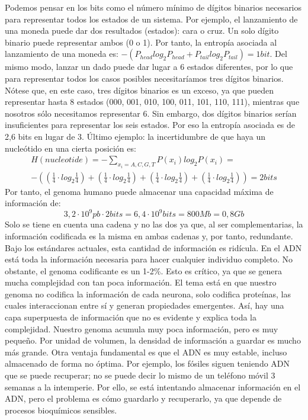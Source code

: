 Podemos pensar en los bits como el número mínimo de dígitos binarios necesarios para representar todos los estados de un sistema. Por ejemplo, el lanzamiento de una moneda puede dar dos resultados (estados): cara o cruz. Un solo dígito binario puede representar ambos (0 o 1). Por tanto, la entropía asociada al lanzamiento de una moneda es: $-(P_{head} log_2 P_{head} + P_{tail} log_2 P_{tail}) = 1 bit$. 
Del mismo modo, lanzar un dado puede dar lugar a 6 estados diferentes, por lo que para representar todos los casos posibles necesitaríamos tres dígitos binarios. Nótese que, en este caso, tres dígitos binarios es un exceso, ya que pueden representar hasta 8 estados (000, 001, 010, 100, 011, 101, 110, 111), mientras que nosotros sólo necesitamos representar 6. Sin embargo, dos dígitos binarios serían insuficientes para representar los seis estados. Por eso la entropía asociada es de 2,6 bits en lugar de 3. Último ejemplo: la incertidumbre de que haya un nucleótido en una cierta posición es:
\begin{align*}
H(nucleotide) = - \sum_{x_i = A, C, G, T} P(x_i) log_2 P(x_i) = \\
 - ((\frac{1}{4} \cdot log_2\frac{1}{4}) + (\frac{1}{4} \cdot log_2\frac{1}{4}) + (\frac{1}{4} \cdot log_2\frac{1}{4}) + (\frac{1}{4} \cdot log_2\frac{1}{4})) = 2 bits
\end{align*}
Por tanto, el genoma humano puede almacenar una capacidad máxima de información de:
$$3,2 \cdot 10^9 pb \cdot 2 bits = 6,4 \cdot 10^9 bits = 800 Mb = 0,8 Gb$$
Solo se tiene en cuenta una cadena y no las dos ya que, al ser complementarias, la información codificada es la misma en ambas cadenas y, por tanto, redundante. 
Bajo los estándares actuales, esta cantidad de información es ridícula. En el ADN está toda la información necesaria para hacer cualquier individuo completo. No obstante, el genoma codificante es un 1-2\%. Esto es crítico, ya que se genera mucha complejidad con tan poca información. El tema está en que nuestro genoma no codifica la información de cada neurona, solo codifica proteínas, las cuales interaccionan entre sí y generan propiedades emergentes. Así, hay una capa superpuesta de información que no es evidente y explica toda la complejidad. 
Nuestro genoma acumula muy poca información, pero es muy pequeño. Por unidad de volumen, la densidad de información a guardar es mucho más grande. Otra ventaja fundamental es que el ADN es muy estable, incluso almacenado de forma no óptima. Por ejemplo, los fósiles siguen teniendo ADN que se puede recuperar; no se puede decir lo mismo de un teléfono móvil 3 semanas a la intemperie. Por ello, se está intentando almacenar información en el ADN, pero el problema es cómo guardarlo y recuperarlo, ya que depende de procesos bioquímicos sensibles.

